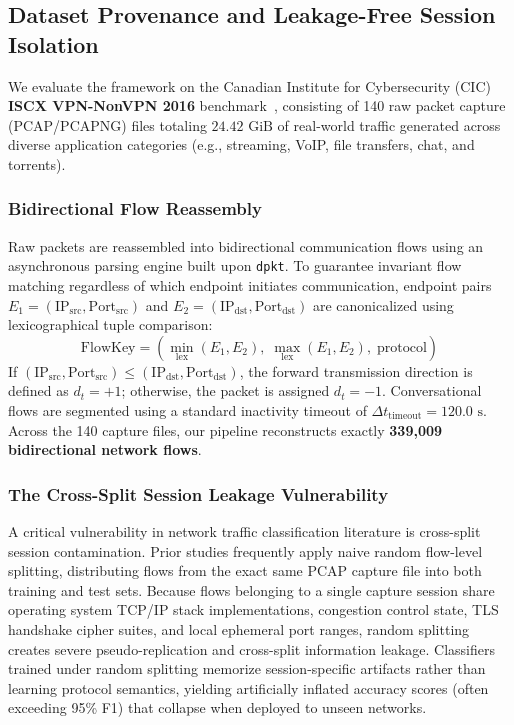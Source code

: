 \documentclass[conference]{IEEEtran}
\begin{document}
\subsection{Dataset Provenance and Leakage-Free Session Isolation}
\label{sec:dataset_isolation}
We evaluate the framework on the Canadian Institute for Cybersecurity (CIC) \textbf{ISCX VPN-NonVPN 2016} benchmark~\cite{b1}, consisting of 140 raw packet capture (PCAP/PCAPNG) files totaling $24.42\text{ GiB}$ of real-world traffic generated across diverse application categories (e.g., streaming, VoIP, file transfers, chat, and torrents).

\subsubsection{Bidirectional Flow Reassembly}
Raw packets are reassembled into bidirectional communication flows using an asynchronous parsing engine built upon \texttt{dpkt}. To guarantee invariant flow matching regardless of which endpoint initiates communication, endpoint pairs $E_1 = (\text{IP}_{\text{src}}, \text{Port}_{\text{src}})$ and $E_2 = (\text{IP}_{\text{dst}}, \text{Port}_{\text{dst}})$ are canonicalized using lexicographical tuple comparison:
\begin{equation}
\text{FlowKey} = \left(\min_{\text{lex}}(E_1, E_2), \; \max_{\text{lex}}(E_1, E_2), \; \text{protocol}\right)
\label{eq:flow_key}
\end{equation}
If $(\text{IP}_{\text{src}}, \text{Port}_{\text{src}}) \le (\text{IP}_{\text{dst}}, \text{Port}_{\text{dst}})$, the forward transmission direction is defined as $d_t = +1$; otherwise, the packet is assigned $d_t = -1$. Conversational flows are segmented using a standard inactivity timeout of $\Delta t_{\text{timeout}} = 120.0\text{ s}$. Across the 140 capture files, our pipeline reconstructs exactly \textbf{339,009 bidirectional network flows}.

\subsubsection{The Cross-Split Session Leakage Vulnerability}
A critical vulnerability in network traffic classification literature is cross-split session contamination. Prior studies frequently apply naive random flow-level splitting, distributing flows from the exact same PCAP capture file into both training and test sets. Because flows belonging to a single capture session share operating system TCP/IP stack implementations, congestion control state, TLS handshake cipher suites, and local ephemeral port ranges, random splitting creates severe pseudo-replication and cross-split information leakage. Classifiers trained under random splitting memorize session-specific artifacts rather than learning protocol semantics, yielding artificially inflated accuracy scores (often exceeding 95\% F1) that collapse when deployed to unseen networks.
\end{document}
